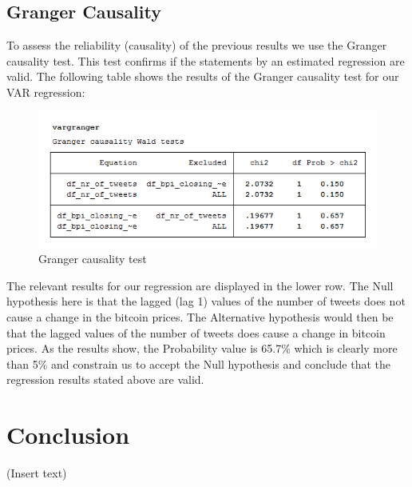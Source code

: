 \documentclass[a4paper,american,12pt]{article}
\begin{document}
\begin{spacing}{1.2}
\subsection{Granger Causality}
To assess the reliability (causality) of the previous results we use the Granger causality test. This test confirms if the statements by an estimated regression are valid. The following table shows the results of the Granger causality test for our VAR regression:\\

\begin{figure}[H]
\centering
\includegraphics[scale=0.85]{stata_export_graphs/granger_test.png}
\caption{Granger causality test}
\label{fig:6}
\end{figure}

The relevant results for our regression are displayed in the lower row. The Null hypothesis here is that the lagged (lag 1) values of the number of tweets does not cause a change in the bitcoin prices. The Alternative hypothesis would then be that the lagged values of the number of tweets does cause a change in bitcoin prices. As the results show, the Probability value is 65.7\% which is clearly more than 5\% and constrain us to accept the Null hypothesis and conclude that the regression results stated above are valid.\\

\clearpage

\section{Conclusion}
\label{sec:Conclustion}
(Insert text)

\clearpage
		
\end{spacing}

\clearpage

\end{document}
